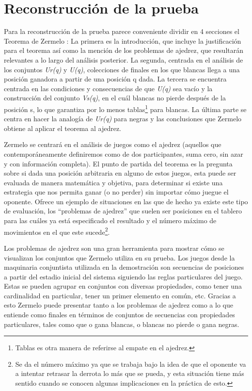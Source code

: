 \documentclass[twoside,openright,12pt,a4paper,spanish]{book}
\begin{document}
\section{Reconstrucción de la prueba}
\noindent Para la reconstrucción de la prueba parece conveniente dividir en 4 secciones el Teorema de Zermelo \citeyear{zermelo1913anwendung}: La primera es la introducción, que incluye la justificación para el teorema así como la mención de los problemas de ajedrez, que resultarán relevantes a lo largo del análisis posterior. La segunda, centrada en el análisis de los conjuntos \emph{Ur(q)} y \emph{U(q)}, colecciones de finales en los que blancas llega a una posición ganadora a partir de una posición q dada. La tercera se encuentra centrada en las condiciones y consecuencias de que \emph{U(q)} sea vacío y la construcción del conjunto \emph{Vs(q)}, en el cuál blancas no pierde después de la posición s, lo que garantiza por lo menos tablas\footnote{Tablas es otra manera de referirse al empate en el ajedrez.} para blancas. La última parte se centra en hacer la analogía de \emph{Ur(q)} para negras y las conclusiones que Zermelo obtiene al aplicar el teorema al ajedrez.

Zermelo se centrará en el análisis de juegos como el ajedrez (aquellos que contemporáneamente definiremos como de dos participantes, suma cero, sin azar y con información completa). El punto de partida del teorema es la pregunta sobre si dada una posición arbitraria en alguno de estos juegos, esta puede ser evaluada de manera matemática y objetiva, para determinar si existe una estrategia que nos permita ganar (o no perder) sin importar cómo juegue el oponente. Ofrece un ejemplo de situaciones en las que de hecho ya existe este tipo de evaluación, los “problemas de ajedrez” que suelen ser posiciones en el tablero para las cuáles ya está especificado el resultado y el número máximo de movimientos en el que este sucede\footnote{Se da el número máximo ya que se trabaja bajo la idea de que el oponente va a intentar retrasar la derrota lo más que se pueda, y esta situación tiene más sentido cuando se conocen algunas implicaciones en la práctica de esto.}. 

Los problemas de ajedrez son una gran herramienta para mostrar cómo se visualizan los conjuntos que Zermelo utiliza en su prueba. Los juegos desde la maquinaria conjuntista utilizada en la demostración son secuencias de posiciones a partir del estadio inicial del sistema siguiendo las reglas particulares del juego. Estas se pueden agrupar en conjuntos con diversas propiedades, como tener una cardinalidad en particular, tener un primer elemento en común, etc. Gracias a esto Zermelo puede presentar tanto a los problemas de ajedrez como a lo que entiende como finales en términos de conjuntos de secuencias con propiedades particulares, tales como que o gana blancas, o blancas no pierde o gana negras. 
\end{document}
